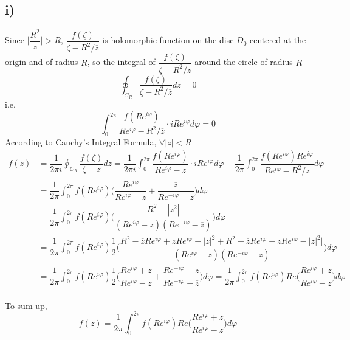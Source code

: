 \documentclass[a4paper,12pt,titlepage]{article}
\begin{document}
\subsection*{i)}
Since $\Big|\dfrac{R^2}{z}\Big|>R$, $\dfrac{f(\zeta)}{\zeta-R^2/\overline{z}}$ is holomorphic function on the disc $D_0$ centered at the origin and of radius $R$, so the integral of $\dfrac{f(\zeta)}{\zeta-R^2/\overline{z}}$ around the circle of radius $R$ 
$$\oint_{C_R} \dfrac{f(\zeta)}{\zeta-R^2/\overline{z}}dz=0$$
i.e.
$$\int_{0}^{2\pi} \dfrac{f(Re^{i\varphi})}{Re^{i\varphi}-R^2/\overline{z}}\cdot iRe^{i\varphi}d\varphi=0$$
According to Cauchy's Integral Formula, $\forall |z|<R$
\begin{align*}
f(z)&=\dfrac{1}{2\pi i}\oint_{C_R} \dfrac{f(\zeta)}{\zeta-z}dz=\dfrac{1}{2\pi i}\int_{0}^{2\pi}\dfrac{f(Re^{i\varphi})}{Re^{i\varphi}-z}\cdot iRe^{i\varphi}d\varphi-\dfrac{1}{2\pi}\int_{0}^{2\pi} \dfrac{f(Re^{i\varphi})Re^{i\varphi}}{Re^{i\varphi}-R^2/\overline{z}} d\varphi\\
&=\dfrac{1}{2\pi}\int_{0}^{2\pi}f(Re^{i\varphi})\Big(\dfrac{Re^{i\varphi}}{Re^{i\varphi}-z}+\dfrac{\overline{z}}{Re^{-i\varphi}-\overline{z}}\Big) d\varphi\\
&=\dfrac{1}{2\pi}\int_{0}^{2\pi}f(Re^{i\varphi})\Big(\dfrac{R^2-|z^2|}{(Re^{i\varphi}-z)(Re^{-i\varphi}-\overline{z})}\Big) d\varphi\\
&=\dfrac{1}{2\pi}\int_{0}^{2\pi}f(Re^{i\varphi})\dfrac{1}{2}\Big(\dfrac{R^2-\overline{z}Re^{i\varphi}+zRe^{i\varphi}-|z|^2+R^2+\overline{z}Re^{i\varphi}-zRe^{i\varphi}-|z|^2|}{(Re^{i\varphi}-z)(Re^{-i\varphi}-\overline{z})}\Big) d\varphi\\
&=\dfrac{1}{2\pi}\int_{0}^{2\pi}f(Re^{i\varphi})\dfrac{1}{2}\Big(\dfrac{Re^{i\varphi}+z}{Re^{i\varphi}-z}+\dfrac{Re^{-i\varphi}+\overline{z}}{Re^{-i\varphi}-\overline{z}}\Big) d\varphi=\dfrac{1}{2\pi}\int_{0}^{2\pi}f(Re^{i\varphi})Re\Big(\dfrac{Re^{i\varphi}+z}{Re^{i\varphi}-z}\Big) d\varphi\\
\end{align*}

To sum up, 
$$f(z)=\dfrac{1}{2\pi}\int_{0}^{2\pi}f(Re^{i\varphi})Re\Big(\dfrac{Re^{i\varphi}+z}{Re^{i\varphi}-z}\Big) d\varphi$$
\end{document}
